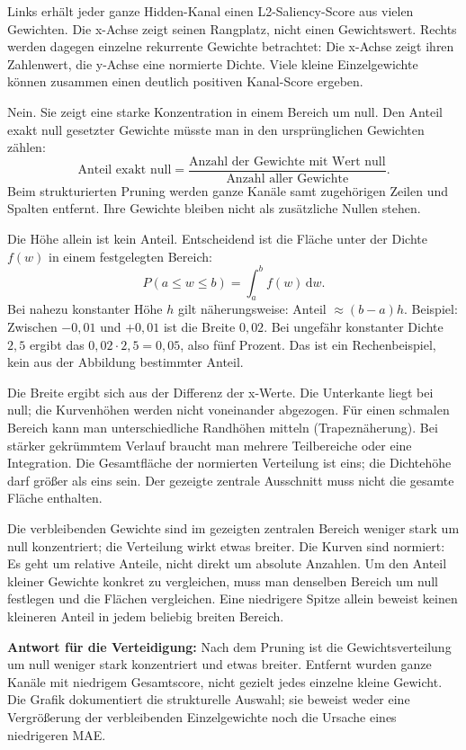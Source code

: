 Links erhält jeder ganze Hidden-Kanal einen L2-Saliency-Score aus vielen Gewichten. Die x-Achse zeigt seinen Rangplatz, nicht einen Gewichtswert. Rechts werden dagegen einzelne rekurrente Gewichte betrachtet: Die x-Achse zeigt ihren Zahlenwert, die y-Achse eine normierte Dichte. Viele kleine Einzelgewichte können zusammen einen deutlich positiven Kanal-Score ergeben.

Nein. Sie zeigt eine starke Konzentration in einem Bereich um null. Den Anteil exakt null gesetzter Gewichte müsste man in den ursprünglichen Gewichten zählen:
\[
\text{Anteil exakt null}=\frac{\text{Anzahl der Gewichte mit Wert null}}{\text{Anzahl aller Gewichte}}.
\]
Beim strukturierten Pruning werden ganze Kanäle samt zugehörigen Zeilen und Spalten entfernt. Ihre Gewichte bleiben nicht als zusätzliche Nullen stehen.

Die Höhe allein ist kein Anteil. Entscheidend ist die Fläche unter der Dichte $f(w)$ in einem festgelegten Bereich:
\[
P(a\leq w\leq b)=\int_a^b f(w)\,\mathrm dw.
\]
Bei nahezu konstanter Höhe $h$ gilt näherungsweise: Anteil $\approx(b-a)h$. Beispiel: Zwischen $-0{,}01$ und $+0{,}01$ ist die Breite $0{,}02$. Bei ungefähr konstanter Dichte $2{,}5$ ergibt das $0{,}02\cdot2{,}5=0{,}05$, also fünf Prozent. Das ist ein Rechenbeispiel, kein aus der Abbildung bestimmter Anteil.

Die Breite ergibt sich aus der Differenz der x-Werte. Die Unterkante liegt bei null; die Kurvenhöhen werden nicht voneinander abgezogen. Für einen schmalen Bereich kann man unterschiedliche Randhöhen mitteln (Trapeznäherung). Bei stärker gekrümmtem Verlauf braucht man mehrere Teilbereiche oder eine Integration. Die Gesamtfläche der normierten Verteilung ist eins; die Dichtehöhe darf größer als eins sein. Der gezeigte zentrale Ausschnitt muss nicht die gesamte Fläche enthalten.

Die verbleibenden Gewichte sind im gezeigten zentralen Bereich weniger stark um null konzentriert; die Verteilung wirkt etwas breiter. Die Kurven sind normiert: Es geht um relative Anteile, nicht direkt um absolute Anzahlen. Um den Anteil kleiner Gewichte konkret zu vergleichen, muss man denselben Bereich um null festlegen und die Flächen vergleichen. Eine niedrigere Spitze allein beweist keinen kleineren Anteil in jedem beliebig breiten Bereich.

\textbf{Antwort für die Verteidigung:} Nach dem Pruning ist die Gewichtsverteilung um null weniger stark konzentriert und etwas breiter. Entfernt wurden ganze Kanäle mit niedrigem Gesamtscore, nicht gezielt jedes einzelne kleine Gewicht. Die Grafik dokumentiert die strukturelle Auswahl; sie beweist weder eine Vergrößerung der verbleibenden Einzelgewichte noch die Ursache eines niedrigeren MAE.
